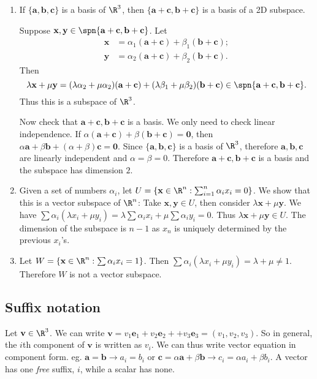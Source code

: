 \documentclass[a4paper]{article}
\begin{document}
\begin{eg}\leavevmode
  \begin{enumerate}
    \item If $\{\mathbf{a, b, c}\}$ is a basis of $\R^3$, then $\{\mathbf{a + c, b + c}\}$ is a basis of a 2D subspace.

      Suppose $\mathbf{x, y}\in \spn\{\mathbf{a + c, b + c}\}$. Let
      \begin{align*}
        \mathbf{x} &= \alpha_1(\mathbf{a + c}) + \beta_1(\mathbf{b + c});\\
        \mathbf{y} &= \alpha_2(\mathbf{a + c}) + \beta_2(\mathbf{b + c}).
      \end{align*}
      Then
      \[
        \lambda\mathbf{x} + \mu\mathbf{y} = (\lambda\alpha_2+\mu\alpha_2)(\mathbf{a + c}) + (\lambda\beta_1 + \mu\beta_2)\mathbf{(b + c)}\in\spn\{\mathbf{a + c, b + c}\}.
      \]
      Thus this is a subspace of $\R^3$.

      Now check that $\mathbf{a + c, b + c}$ is a basis. We only need to check linear independence. If $\alpha(\mathbf{a + c}) + \beta(\mathbf{b + c}) = \mathbf{0}$, then $\alpha\mathbf{a} + \beta\mathbf{b} + (\alpha + \beta)\mathbf{c} = \mathbf{0}$. Since $\{\mathbf{a, b, c}\}$ is a basis of $\R^3$, therefore $\mathbf{a, b, c}$ are linearly independent and $\alpha = \beta = 0$. Therefore $\mathbf{a + c, b + c}$ is a basis and the subspace has dimension $2$.
    \item Given a set of numbers $\alpha_i$, let $U = \{\mathbf{x}\in \R^n: \sum_{i=1}^n \alpha_ix_i = 0\}$. We show that this is a vector subspace of $\R^n$: Take $\mathbf{x, y}\in U$, then consider $\lambda\mathbf{x} + \mu\mathbf{y}$. We have $\sum\alpha_i(\lambda x_i + \mu y_i) = \lambda\sum\alpha_ix_i + \mu\sum\alpha_iy_i = 0$. Thus $\lambda\mathbf{x} + \mu\mathbf{y} \in U$. The dimension of the subspace is $n-1$ as $x_n$ is uniquely determined by the previous $x_i$'s.
    \item Let $W = \{\mathbf{x}\in \R^n: \sum \alpha_ix_i = 1\}$. Then $\sum\alpha_i(\lambda x_i + \mu y_i) = \lambda + \mu \not= 1$. Therefore $W$ is not a vector subspace.
  \end{enumerate}
\end{eg}

\subsection{Suffix notation}
Let $\mathbf{v}\in \R^3$. We can write $\mathbf{v} = v_1\mathbf{e}_1 + v_2\mathbf{e}_2 +  + v_3\mathbf{e}_3 = (v_1, v_2, v_3)$. So in general, the $i$th component of $\mathbf{v}$ is written as $v_i$. We can thus write vector equation in component form. eg. $\mathbf{a = b} \rightarrow a_i = b_i$ or $\mathbf{c}=\alpha\mathbf{a} + \beta\mathbf{b} \rightarrow c_i = \alpha a_i + \beta b_i$. A vector has one \emph{free} suffix, $i$, while a scalar has none.
\end{document}
